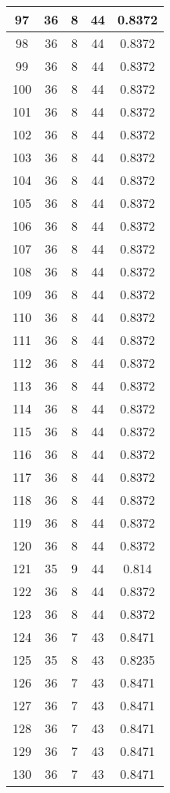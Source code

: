 \documentclass[letterpaper, 12pt]{article}
\begin{document}
\begin{longtable}{|c|c|c|c|c|}
\hline
97 & 36 & 8 & 44 & 0.8372 \\
\hline
98 & 36 & 8 & 44 & 0.8372 \\
\hline
99 & 36 & 8 & 44 & 0.8372 \\
\hline
100 & 36 & 8 & 44 & 0.8372 \\
\hline
101 & 36 & 8 & 44 & 0.8372 \\
\hline
102 & 36 & 8 & 44 & 0.8372 \\
\hline
103 & 36 & 8 & 44 & 0.8372 \\
\hline
104 & 36 & 8 & 44 & 0.8372 \\
\hline
105 & 36 & 8 & 44 & 0.8372 \\
\hline
106 & 36 & 8 & 44 & 0.8372 \\
\hline
107 & 36 & 8 & 44 & 0.8372 \\
\hline
108 & 36 & 8 & 44 & 0.8372 \\
\hline
109 & 36 & 8 & 44 & 0.8372 \\
\hline
110 & 36 & 8 & 44 & 0.8372 \\
\hline
111 & 36 & 8 & 44 & 0.8372 \\
\hline
112 & 36 & 8 & 44 & 0.8372 \\
\hline
113 & 36 & 8 & 44 & 0.8372 \\
\hline
114 & 36 & 8 & 44 & 0.8372 \\
\hline
115 & 36 & 8 & 44 & 0.8372 \\
\hline
116 & 36 & 8 & 44 & 0.8372 \\
\hline
117 & 36 & 8 & 44 & 0.8372 \\
\hline
118 & 36 & 8 & 44 & 0.8372 \\
\hline
119 & 36 & 8 & 44 & 0.8372 \\
\hline
120 & 36 & 8 & 44 & 0.8372 \\
\hline
121 & 35 & 9 & 44 & 0.814 \\
\hline
122 & 36 & 8 & 44 & 0.8372 \\
\hline
123 & 36 & 8 & 44 & 0.8372 \\
\hline
124 & 36 & 7 & 43 & 0.8471 \\
\hline
125 & 35 & 8 & 43 & 0.8235 \\
\hline
126 & 36 & 7 & 43 & 0.8471 \\
\hline
127 & 36 & 7 & 43 & 0.8471 \\
\hline
128 & 36 & 7 & 43 & 0.8471 \\
\hline
129 & 36 & 7 & 43 & 0.8471 \\
\hline
130 & 36 & 7 & 43 & 0.8471 \\

\end{longtable}
\end{document}
